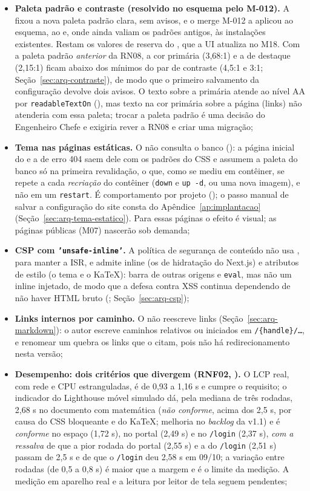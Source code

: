 \begin{itemize}
  \item \textbf{Paleta padrão e contraste (resolvido no esquema pelo M-012).} A  fixou a nova paleta padrão clara, sem avisos, e o merge M-012 a aplicou ao esquema, ao  e, onde ainda valiam os padrões antigos, às instalações existentes. Restam os valores de reserva do , que a UI atualiza no M18. Com a paleta padrão \emph{anterior} da RN08, a cor primária (3,68:1) e a de destaque (2,15:1) ficam abaixo dos mínimos do par de contraste (4,5:1 e 3:1; Seção~\ref{sec:arq-contraste}), de modo que o primeiro salvamento da configuração devolve dois avisos. O texto sobre a primária atende ao nível AA por \texttt{readableTextOn} (), mas texto na cor primária sobre a página (links) não atenderia com essa paleta; trocar a paleta padrão é uma decisão do Engenheiro Chefe e exigiria rever a RN08 e criar uma migração;
  \item \textbf{Tema nas páginas estáticas.} O  não consulta o banco (): a página inicial do  e a de erro 404 saem dele com os padrões do CSS e assumem a paleta do banco só na primeira revalidação, o que, como se mediu em contêiner, se repete a cada \emph{recriação} do contêiner (\texttt{down} e \texttt{up -d}, ou uma nova imagem), e não em um \texttt{restart}. É comportamento por projeto (); o passo manual de salvar a configuração do site consta do Apêndice~\ref{ap:implantacao} (Seção~\ref{sec:arq-tema-estatico}). Para essas páginas o efeito é visual; as páginas públicas (M07) nascerão sob demanda;
  \item \textbf{CSP com \texttt{'unsafe-inline'}.} A política de segurança de conteúdo não usa , para manter a ISR, e admite  inline (os de hidratação do Next.js) e atributos de estilo (o tema e o KaTeX): barra  de outras origens e \texttt{eval}, mas não um  inline injetado, de modo que a defesa contra XSS continua dependendo de não haver HTML bruto (; Seção~\ref{sec:arq-csp});
  \item \textbf{Links internos por caminho.} O  não reescreve links (Seção~\ref{sec:arq-markdown}): o autor escreve caminhos relativos ou iniciados em \texttt{/\{handle\}/\ldots}, e renomear um  quebra os links que o citam, pois não há redirecionamento nesta versão;
  \item \textbf{Desempenho: dois critérios que divergem (RNF02, ).} O LCP real, com rede e CPU estranguladas, é de 0,93 a 1,16 s e cumpre o requisito; o indicador do Lighthouse móvel simulado dá, pela mediana de três rodadas, 2,68 s no documento com matemática (\emph{não conforme}, acima dos 2,5 s, por causa do CSS bloqueante e do KaTeX; melhoria no \emph{backlog} da v1.1) e é \emph{conforme} no espaço (1,72 s), no portal (2,49 s) e no \texttt{/login} (2,37 s), \emph{com a ressalva} de que a pior rodada do portal (2,55 s) e a do \texttt{/login} (2,51 s) passam de 2,5 s e de que o \texttt{/login} deu 2,58 s em 09/10; a variação entre rodadas (de 0,5 a 0,8 s) é maior que a margem e é o limite da medição. A medição em aparelho real e a leitura por leitor de tela seguem pendentes;

\end{itemize}
